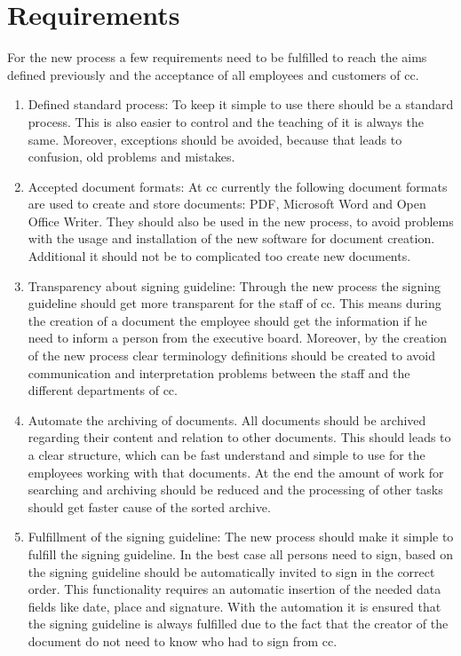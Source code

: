 \section{Requirements}
For the new process a few requirements need to be fulfilled to reach the aims defined previously and the acceptance of all employees and customers of \gls{cc}.
\begin{enumerate}
	\item Defined standard process: \newline
	To keep it simple to use there should be a standard process. This is also easier to control and the teaching of it is always the same. Moreover, exceptions should be avoided, because that leads to confusion, old problems and mistakes.
	\item Accepted document formats: \newline
	At \gls{cc} currently the following document formats are used to create and store documents: \gls{PDF}, Microsoft Word and Open Office Writer. They should also be used in the new process, to avoid problems with the usage and installation of the new software for document creation. Additional it should not be to complicated too create new documents.
	\item Transparency about signing guideline: \newline
	Through the new process the signing guideline should get more transparent for the staff of \gls{cc}. This means during the creation of a document the employee should get the information if he need to inform a person from the executive board. Moreover, by the creation of the new process clear terminology definitions should be created to avoid communication and interpretation problems between the staff and the different departments of \gls{cc}.
	\item Automate the archiving of documents. \newline
	All documents should be archived regarding their content and relation to other documents. This should leads to a clear structure, which can be fast understand and simple to use for the employees working with that documents. At the end the amount of work for searching and archiving should be reduced and the processing of other tasks should get faster cause of the sorted archive.
	\item Fulfillment of the signing guideline:\newline
	The new process should make it simple to fulfill the signing guideline. In the best case all persons need to sign, based on the signing guideline should be automatically invited to sign in the correct order. This functionality requires an automatic insertion of the needed data fields like date, place and signature. With the automation it is ensured that the signing guideline is always fulfilled due to the fact that the creator of the document do not need to know who had to sign from \gls{cc}.

\end{enumerate}
